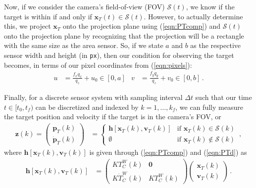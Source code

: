 \documentclass[11pt]{article}
\begin{document}
Now, if we consider the camera's field-of-view (FOV) $\mathcal S(t)$, we know if the target is within if and only if $\mathbf x_T(t)\in\mathcal S(t)$. However, to actually determine this, we project $\mathbf x_T$ onto the projection plane using (\ref{eqn:PTcomp}) and $\mathcal S(t)$ onto the projection plane by recognizing that the projection will be a rectangle with the same size as the area sensor. So, if we state $a$ and $b$ as the respective sensor width and height (in \texttt{px}), then our condition for observing the target becomes, in terms of our pixel coordinates from (\ref{eqn:pixels}):
\begin{align}\label{eqn:observe}
    u&=\frac{f_xq_x}{q_z}+u_0\in[0,a] & v&=\frac{f_yq_y}{q_z}+v_0\in[0,b]\,.
\end{align}

Finally, for a discrete sensor system with sampling interval $\Delta t$ such that our time $t\in[t_0,t_f)$ can be discretized and indexed by $k=1,\dots,k_f$, we can fully measure the target position and velocity if the target is in the camera's FOV, or
\begin{align}\label{eqn:zk}
    \mathbf z(k)=\begin{pmatrix}
        \mathbf p_T(k)\\\dot{\mathbf p}_T(k)
    \end{pmatrix}&=\begin{cases}
        \mathbf h[\mathbf x_T(k),\mathbf v_T(k)] & \text{if }\mathbf x_T(k)\in\mathcal S(k)\\
        \emptyset & \text{if }\mathbf x_T(k)\notin\mathcal S(k)
    \end{cases}\,,
\end{align}
where $\mathbf h[\mathbf x_T(k),\mathbf v_T(k)]$ is given through (\ref{eqn:PTcomp}) and (\ref{eqn:PTd}) as
\begin{align}\label{eqn:hk}
    \mathbf h[\mathbf x_T(k),\mathbf v_T(k)]&=\begin{pmatrix}
        KT_C^W(k) & \mathbf0\\K\dot T_C^W(k) & KT_C^W(k)
    \end{pmatrix}\begin{pmatrix}
        \mathbf x_T(k)\\\mathbf v_T(k)
    \end{pmatrix}\,.
\end{align}
\end{document}
